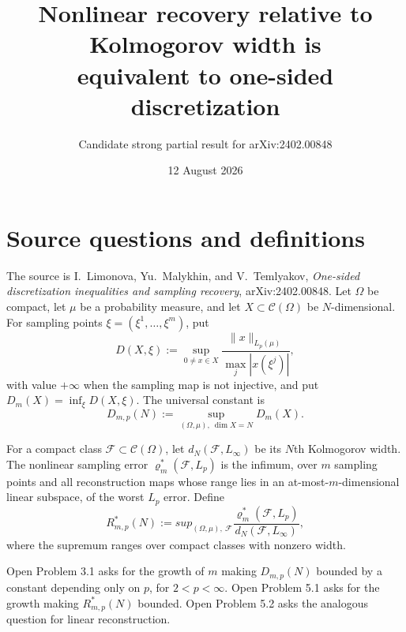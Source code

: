 \documentclass[11pt]{article}
\title{Nonlinear recovery relative to Kolmogorov width is\\
equivalent to one-sided discretization}
\author{Candidate strong partial result for arXiv:2402.00848}
\date{12 August 2026}
\newcommand{\C}{\mathcal C}
\newcommand{\F}{\mathcal F}
\newcommand{\rhoo}{\varrho^{*}}
\begin{document}
\maketitle

\begin{center}
\end{center}

\section{Source questions and definitions}

The source is I.~Limonova, Yu.~Malykhin, and V.~Temlyakov,
\emph{One-sided discretization inequalities and sampling recovery},
arXiv:2402.00848.  Let $\Omega$ be compact, let $\mu$ be a probability
measure, and let $X\subset\C(\Omega)$ be $N$-dimensional.  For sampling points
$\xi=(\xi^1,\ldots,\xi^m)$, put
\[
 D(X,\xi):=\sup_{0\ne x\in X}
 \frac{\|x\|_{L_p(\mu)}}{\max_j|x(\xi^j)|},
\]
with value $+\infty$ when the sampling map is not injective, and put
$D_m(X)=\inf_\xi D(X,\xi)$.  The universal constant is
\[
 D_{m,p}(N):=\sup_{(\Omega,\mu),\ \dim X=N}D_m(X).
\]

For a compact class $\F\subset\C(\Omega)$, let $d_N(\F,L_\infty)$ be its
$N$th Kolmogorov width.  The nonlinear sampling error $\rhoo_m(\F,L_p)$ is
the infimum, over $m$ sampling points and all reconstruction maps whose range
lies in an at-most-$m$-dimensional linear subspace, of the worst $L_p$ error.
Define
\[
 R^*_{m,p}(N):=sup_{(\Omega,\mu),\ \F}
 \frac{\rhoo_m(\F,L_p)}{d_N(\F,L_\infty)},
\]
where the supremum ranges over compact classes with nonzero width.

Open Problem 3.1 asks for the growth of $m$ making $D_{m,p}(N)$ bounded by a
constant depending only on $p$, for $2<p<\infty$.  Open Problem 5.1 asks for
the growth making $R^*_{m,p}(N)$ bounded.  Open Problem 5.2 asks the analogous
question for linear reconstruction.
\end{document}
